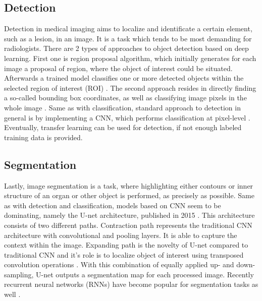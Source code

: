 \subsection{Detection}
Detection in medical imaging aims to localize and identificate a certain element, such as a lesion, in an image. It is a task which tends to be most demanding for radiologists. There are 2 types of approaches to object detection based on deep learning. First one is region proposal algorithm, which initially generates for each image a proposal of region, where the object of interest could be situated. Afterwards a trained model classifies one or more detected objects within the selected region of interest (ROI) \cite{kim2019deep}. The second approach resides in directly finding a so-called bounding box coordinates, as well as classifying image pixels in the whole image \cite{kim2019deep}. Same as with classification, standard approach to detection in general is by implementing a CNN, which performs classification at pixel-level \cite{surveyOnImageing}. Eventually, transfer learning can be used for detection, if not enough labeled training data is provided. 
\subsection{Segmentation}
Lastly, image segmentation is a task, where highlighting either contours or inner structure of an organ or other object is performed, as precisely as possible. Same as with detection and classification, models based on CNN seem to be dominating, namely the U-net architecture, published in 2015 \cite{kim2019deep}. This architecture consists of two different paths. Contraction path represents the traditional CNN architecture with convolutional and pooling layers. It is able to capture the context within the image. Expanding path is the novelty of U-net compared to traditional CNN and it's role is to localize object of interest using transposed convolution operations \cite{surveyOnImageing}. With this combination of equally applied up- and down-sampling, U-net outputs a segmentation map for each processed image. Recently recurrent neural networks (RNNs) have become popular for segmentation tasks as well \cite{surveyOnImageing}. 